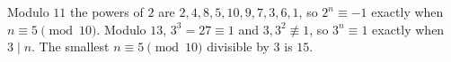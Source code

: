 Modulo $11$ the powers of $2$ are $2,4,8,5,10,9,7,3,6,1$, so $2^n\equiv-1$ exactly when $n\equiv5\pmod{10}$. Modulo $13$, $3^3=27\equiv1$ and $3,3^2\not\equiv1$, so $3^n\equiv1$ exactly when $3\mid n$. The smallest $n\equiv5\pmod{10}$ divisible by $3$ is $\boxed{15}$.
